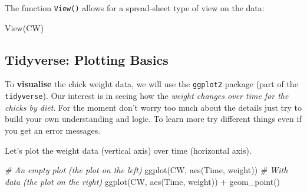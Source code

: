 \documentclass[
  14pt,
]{memoir}
\newenvironment{Shaded}{\begin{snugshade}}{\end{snugshade}}
\newcommand{\CommentTok}[1]{\textcolor[rgb]{0.56,0.35,0.01}{\textit{#1}}}
\newcommand{\FunctionTok}[1]{\textcolor[rgb]{0.00,0.00,0.00}{#1}}
\newcommand{\NormalTok}[1]{#1}
\newcommand{\SpecialCharTok}[1]{\textcolor[rgb]{0.00,0.00,0.00}{#1}}
\begin{document}
The function \texttt{View()} allows for a spread-sheet type of view on the data:

\begin{Shaded}
\begin{Highlighting}[]
\FunctionTok{View}\NormalTok{(CW)}
\end{Highlighting}
\end{Shaded}

\hypertarget{tidyverse-plotting-basics}{%
\subsection{Tidyverse: Plotting Basics}\label{tidyverse-plotting-basics}}

To \textbf{visualise} the chick weight data, we will use the \texttt{ggplot2} package (part of the
\texttt{tidyverse}). Our interest is in seeing how the \emph{weight changes over time for the chicks by
diet}. For the moment don't worry too much about the details just try to build your own
understanding and logic. To learn more try different things even if you get an error
messages.

Let's plot the weight data (vertical axis) over time (horizontal axis).

\begin{Shaded}
\begin{Highlighting}[]
\CommentTok{\# An empty plot (the plot on the left)}
\FunctionTok{ggplot}\NormalTok{(CW, }\FunctionTok{aes}\NormalTok{(Time, weight))  }
\CommentTok{\# With data (the plot on the right)}
\FunctionTok{ggplot}\NormalTok{(CW, }\FunctionTok{aes}\NormalTok{(Time, weight)) }\SpecialCharTok{+} \FunctionTok{geom\_point}\NormalTok{() }
\end{Highlighting}
\end{Shaded}
\end{document}
